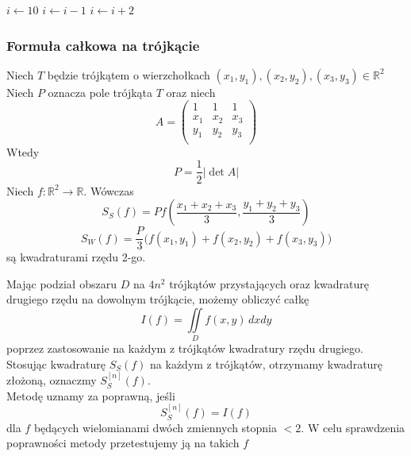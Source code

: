 \documentclass[9pt]{beamer}
\begin{document}
\begin{frame}
	\begin{algorithmic}
		\State $i \gets 10$
		\State $i \gets i-1$
		\Else
		\State $i \gets i+2$
		\EndIf
		\EndIf 
	\end{algorithmic}
\end{frame}


\begin{frame}
    \frametitle{Formuła całkowa na trójkącie}
    Niech $T$ będzie trójkątem o wierzchołkach $(x_1,y_1), (x_2,y_2), (x_3,y_3) \in \mathbb{R}^2$
    Niech $P$ oznacza pole trójkąta $T$ oraz niech 
    $$ A = \begin{pmatrix}
    	1 & 1 & 1 \\
    	x_1 & x_2 & x_3 \\
    	y_1 & y_2 & y_3 \\
    \end{pmatrix} $$
    Wtedy $$P = \frac{1}{2}|\det{A}|$$
    Niech $f : \mathbb{R}^2 \to \mathbb{R}$. Wówczas 
    $$S_S(f) = P f \left(\frac{x_1+x_2+x_3}{3},\frac{y_1+y_2+y_3}{3} \right) $$
    $$S_W(f) = \frac{P}{3} \Big( f(x_1,y_1) + f(x_2,y_2) + f(x_3,y_3) \Big)$$
    są kwadraturami rzędu 2-go.
    
\end{frame}

\begin{frame}
	 \begin{spacing}{1.5}
	Mając podział obszaru $ D $ na $4 n^2 $ trójkątów przystających oraz kwadraturę drugiego rzędu na dowolnym trójkącie, możemy obliczyć całkę $$ I(f) = \iint\limits_D f(x,y)  \, dxdy $$ poprzez zastosowanie na każdym z trójkątów kwadratury rzędu drugiego.\\
	
	Stosując kwadraturę $ S_S(f) $ na każdym z trójkątów, 
	otrzymamy kwadraturę złożoną, oznaczmy $ S_S^{[n]}(f) $.\\
   
    Metodę uznamy za poprawną, jeśli 
    $$ S_S^{[n]}(f) = I(f) $$
    dla $f$ będących wielomianami dwóch zmiennych stopnia $ < 2$. 
	W celu sprawdzenia poprawności metody przetestujemy ją na takich $f$ \par
	

	\end{spacing}
\end{frame}
\end{document}
